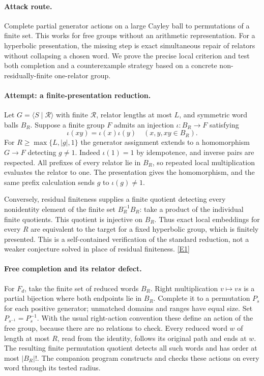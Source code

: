\documentclass[11pt,a4paper]{article}
\newcommand{\eref}[2]{\hyperlink{extra:#1:#2}{[E#2]}}
\numberwithin{equation}{section}
\begin{document}
\paragraph{Attack route.}
Complete partial generator actions on a large Cayley ball to permutations
of a finite set. This works for free groups without an arithmetic
representation. For a hyperbolic presentation, the missing step is exact
simultaneous repair of relators without collapsing a chosen word. We prove
the precise local criterion and test both completion and a counterexample
strategy based on a concrete non-residually-finite one-relator group.

\paragraph{Attempt: a finite-presentation reduction.}
Let $G=\langle S\mid\mathcal R\rangle$ with finite $\mathcal R$, relator
lengths at most $L$, and symmetric word balls $B_R$. Suppose a finite group
$F$ admits an injection $\iota:B_R\to F$ satisfying
\[
 \iota(xy)=\iota(x)\iota(y)\quad(x,y,xy\in B_R).
\]
For $R\ge\max\{L,|g|,1\}$ the generator assignment extends to a homomorphism
$G\to F$ detecting $g\ne1$. Indeed $\iota(1)=1$ by idempotence, and
inverse pairs are respected. All prefixes of every relator lie in $B_R$,
so repeated local multiplication evaluates the relator to one. The
presentation gives the homomorphism, and the same prefix calculation sends
$g$ to $\iota(g)\ne1$.

Conversely, residual finiteness supplies a finite quotient detecting every
nonidentity element of the finite set $B_R^{-1}B_R$: take a product of the
individual finite quotients. This quotient is injective on $B_R$. Thus exact
local embeddings for every $R$ are equivalent to the target for a fixed
hyperbolic group, which is finitely presented. This is a self-contained
verification of the standard reduction, not a weaker conjecture solved
in place of residual finiteness. \eref{30006750}{1}

\paragraph{Free completion and its relator defect.}
For $F_d$, take the finite set of reduced words $B_R$. Right multiplication
$v\mapsto vs$ is a partial bijection where both endpoints lie in $B_R$.
Complete it to a permutation $P_s$ for each positive generator; unmatched
domains and ranges have equal size. Set $P_{s^{-1}}=P_s^{-1}$. With the
usual right-action convention these define an action of the free group,
because there are no relations to check. Every reduced word $w$ of length
at most $R$, read from the identity, follows its original path and ends at
$w$. The resulting finite permutation quotient detects all such words and
has order at most $|B_R|!$. The companion program constructs and checks
these actions on every word through its tested radius.
\end{document}
